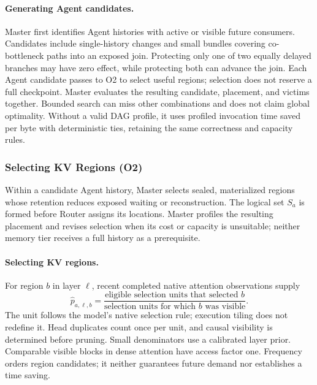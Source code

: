 \paragraph{Generating Agent candidates.}
Master first identifies Agent histories with active or visible future
consumers. Candidates include single-history changes and small bundles
covering co-bottleneck paths into an exposed join. Protecting only one
of two equally delayed branches may have zero effect, while protecting
both can advance the join. Each Agent candidate passes to O2 to
select useful regions; selection does not reserve a full checkpoint.
Master evaluates the resulting candidate, placement, and victims
together. Bounded search can miss other combinations and does not claim
global optimality. Without a valid DAG profile, it uses profiled
invocation time saved per byte with deterministic ties, retaining the
same correctness and capacity rules.

\subsubsection{Selecting KV Regions (O2)}
\label{sec:region-selection}

Within a candidate Agent history, Master selects sealed, materialized
regions whose retention reduces exposed waiting or reconstruction.
The logical set $S_a$ is formed before Router assigns its locations.
Master profiles the resulting placement and revises selection when its
cost or capacity is unsuitable; neither memory tier receives a full
history as a prerequisite.

\paragraph{Selecting KV regions.}
For region $b$ in layer $\ell$, recent completed native attention
observations supply
\begin{equation}
 \widehat p_{a,\ell,b}=
 \frac{\text{eligible selection units that selected }b}
      {\text{selection units for which }b\text{ was visible}}.
 \label{eq:demand}
\end{equation}
The unit follows the model's native selection rule; execution tiling
does not redefine it. Head duplicates count once per unit, and causal
visibility is determined before pruning. Small denominators use a
calibrated layer prior. Comparable visible blocks in dense attention
have access factor one. Frequency orders region candidates; it neither
guarantees future demand nor establishes a time saving.

